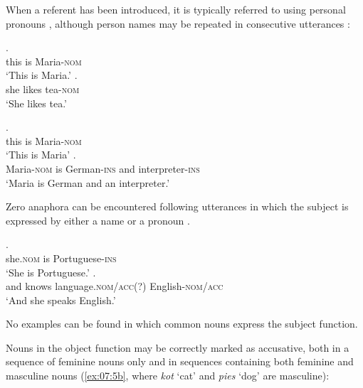 When a referent has been introduced, it is typically referred to using personal pronouns , although person names may be repeated in consecutive utterances :

\ea%
    \label{ex:07:2}
    \ea\label{ex:07:2a}
    .\\
            \hspaceThis{[}this  is  Maria-\textsc{nom}\\
    \glt    ‘This is Maria.’
    \ex\label{ex:07:2b}
    .\\
            \hspaceThis{[}she  likes  tea-\textsc{nom}\\
    \glt    ‘She likes tea.’
    \z
\z

\ea%
    \label{ex:07:3}
    \ea\label{ex:07:3a}
    .\\
            \hspaceThis{[}this  is  Maria-\textsc{nom}\\
    \glt    ‘This is Maria’
    \ex\label{ex:07:3b}
    .\\
            \hspaceThis{[}Maria-\textsc{nom}  is  German-\textsc{ins}  and  interpreter-\textsc{ins}\\
    \glt    ‘Maria is German and an interpreter.’
    \z
\z

Zero anaphora can be encountered  following utterances in which the subject is expressed by either a name or a pronoun .

\ea%
    \label{ex:07:4}
    \ea\label{ex:07:4a}
    .\\
            \hspaceThis{[}she\textsc{.nom}  is  Portuguese-\textsc{ins}\\
    \glt    ‘She is Portuguese.’
    \ex\label{ex:07:4b}
    .\\
            \hspaceThis{[}and  knows  language\textsc{.nom/acc(?)}  English-\textsc{nom}/\textsc{acc} \\
    \glt    ‘And she speaks English.’
    \z
\z

No examples can be found in which common nouns express the subject function. 

Nouns in the object function may be correctly marked as accusative, both in a sequence of feminine nouns only  and in sequences containing both feminine and masculine nouns  (\ref{ex:07:5b}, where \textit{kot} ‘cat’ and \textit{pies} ‘dog’ are masculine):

